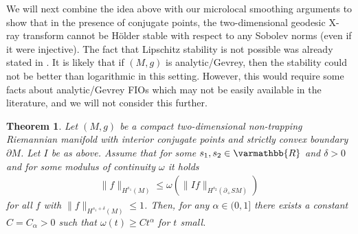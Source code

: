 \documentclass[12pt,twoside]{amsart}
\numberwithin{equation}{section}
\renewcommand{\leq}{\leqslant}
\renewcommand{\geq}{\geqslant}
\renewcommand{\mathbb}{\varmathbb}
\newtheorem{theorem}{Theorem}[section]
\newcommand {\R} {\mathbb{R}} \newcommand {\Z} {\mathbb{Z}}
\begin{document}
We will next combine the idea above with our microlocal smoothing arguments to show that in the presence of conjugate points, the two-dimensional geodesic X-ray transform cannot be H\"older stable with respect to any Sobolev norms (even if it were injective). The fact that Lipschitz stability is not possible was already stated in \cite{MSU15}. It is likely that if $(M,g)$ is analytic/Gevrey, then the stability could not be better than logarithmic in this setting. However, this would require some facts about analytic/Gevrey FIOs which may not be easily available in the literature, and we will not consider this further.


\begin{theorem}
\label{thm:geodesic}
Let $(M,g)$ be a compact two-dimensional non-trapping Riemannian manifold with interior conjugate points and strictly convex boundary $\partial M$. Let $I$ be as above. Assume that for some $s_1, s_2 \in \R$ and $\delta>0$ and for some modulus of continuity $\omega$ it holds
\begin{align*}
 \| f \|_{H^{s_1}(M)} \leq \omega(\|I f\|_{H^{s_2}(\partial_+ SM)})
\end{align*}
for all $f$ with $\|f\|_{H^{s_1 +\delta}(M)}\leq 1$.
Then, for any $\alpha \in (0,1]$ there exists a constant $C=C_{\alpha}>0$ such that $\omega(t)\geq C t^{\alpha}$ for $t$ small. 
\end{theorem}
\end{document}
